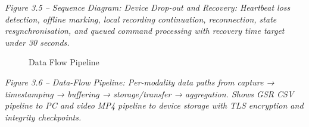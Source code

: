 \documentclass[12pt,a4paper]{article}
\begin{document}
\emph{Figure 3.5 -- Sequence Diagram: Device Drop-out and Recovery: Heartbeat loss detection, offline marking, local recording continuation, reconnection, state resynchronisation, and queued command processing with recovery time target under 30 seconds.}

\begin{figure}
\centering
{}
\caption{Data Flow Pipeline}
\end{figure}

\emph{Figure 3.6 -- Data-Flow Pipeline: Per-modality data paths from capture → timestamping → buffering → storage/transfer → aggregation. Shows GSR CSV pipeline to PC and video MP4 pipeline to device storage with TLS encryption and integrity checkpoints.}
\end{document}
